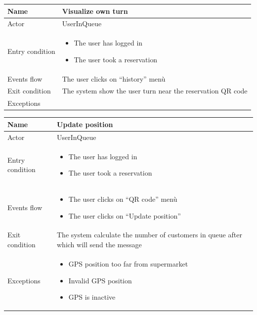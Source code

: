 \par \medskip

\begin{tabular}{|p{5cm} | p{7cm} | }
	\hline
	Name & Visualize own turn \\
	\hline
	Actor & UserInQueue \\
	\hline
	Entry condition &
	\begin{itemize}
		\item The user has logged in
		\item The user took a reservation
	\end{itemize} \\
	\hline
	Events flow & 
	The user clicks on “history” menù \\
	\hline
	Exit condition &
	The system show the user turn near the reservation QR code \\
	\hline 
	Exceptions & \\
	\hline
\end{tabular}

\par \medskip

\begin{tabular}{|p{5cm} | p{7cm} | }
	\hline
	Name & Update position  \\
	\hline
	Actor & UserInQueue \\
	\hline
	Entry condition &
	\begin{itemize}
		\item The user has logged in
		\item The user took a reservation
	\end{itemize} \\
	\hline
	Events flow & 
	\begin{itemize}
		\item The user clicks on “QR code” menù
		\item The user clicks on “Update position”
	\end{itemize} \\
	\hline
	Exit condition &
	The system calculate the number of customers in queue after which will send the message  \\
	\hline 
	Exceptions & 
	\begin{itemize}
		\item GPS position too far from supermarket
		\item Invalid GPS position
		\item GPS is inactive
	\end{itemize} \\
	\hline
\end{tabular}

